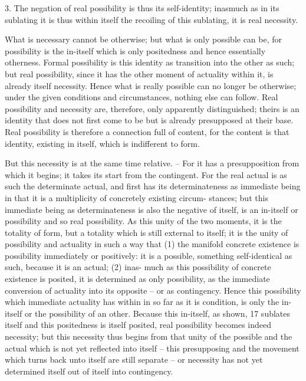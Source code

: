 3. The negation of real possibility is thus its self-identity; inasmuch as in
its sublating it is thus within itself the recoiling of this sublating, it is real
necessity.

What is necessary cannot be otherwise; but what is only possible can be,
for possibility is the in-itself which is only positedness and hence essentially
otherness. Formal possibility is this identity as transition into the other as
such; but real possibility, since it has the other moment of actuality within
it, is already itself necessity. Hence what is really possible can no longer
be otherwise; under the given conditions and circumstances, nothing else
can follow. Real possibility and necessity are, therefore, only apparently
distinguished; theirs is an identity that does not first come to be but is
already presupposed at their base. Real possibility is therefore a connection
full of content, for the content is that identity, existing in itself, which is
indifferent to form.

But this necessity is at the same time relative. – For it has a presupposition
from which it begins; it takes its start from the contingent. For the real
actual is as such the determinate actual, and first has its determinateness as
immediate being in that it is a multiplicity of concretely existing circum-
stances; but this immediate being as determinateness is also the negative of
itself, is an in-itself or possibility and so real possibility. As this unity of the
two moments, it is the totality of form, but a totality which is still external
to itself; it is the unity of possibility and actuality in such a way that (1) the
manifold concrete existence is possibility immediately or positively: it is a
possible, something self-identical as such, because it is an actual; (2) inas-
much as this possibility of concrete existence is posited, it is determined as
only possibility, as the immediate conversion of actuality into its opposite –
or as contingency. Hence this possibility which immediate actuality has
within in so far as it is condition, is only the in-itself or the possibility of an
other. Because this in-itself, as shown, 17 sublates itself and this positedness
is itself posited, real possibility becomes indeed necessity; but this necessity
thus begins from that unity of the possible and the actual which is not yet
reflected into itself – this presupposing and the movement which turns back
unto itself are still separate – or necessity has not yet determined itself out of
itself into contingency.

